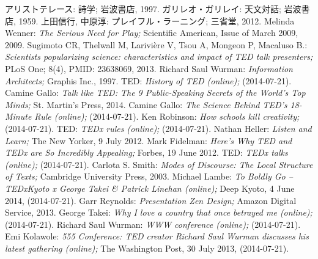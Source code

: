 \documentclass[submit,techreq,jkeyword,noauthor]{ipsj}
\begin{document}
\begin{thebibliography}{10}
 アリストテレース: 詩学; 岩波書店, 1997.
 ガリレオ・ガリレイ: 天文対話; 岩波書店, 1959.
 上田信行, 中原淳: プレイフル・ラーニング; 三省堂, 2012.
 Melinda Wenner: \textsl{The Serious Need for Play;} Scientific American, Issue of March 2009, 2009.
 Sugimoto CR, Thelwall M, Larivière V, Tsou A, Mongeon P, Macaluso B.: \textsl{Scientists popularizing science: characteristics and impact of TED talk presenters;} PLoS One; 8(4), PMID: 23638069, 2013. 
 Richard Saul Wurman: \textsl{Information Architects;} Graphis Inc., 1997.
 TED: \textsl{History of TED (online);}  (2014-07-21).
 Camine Gallo: \textsl{Talk like TED: The 9 Public-Speaking Secrets of the World's Top Minds;} St. Martin's Press, 2014.
 Camine Gallo: \textsl{The Science Behind TED's 18-Minute Rule (online);}  (2014-07-21).
 Ken Robinson: \textsl{How schools kill creativity;}  (2014-07-21).
 TED: \textsl{TEDx rules (online);}  (2014-07-21).
 Nathan Heller: \textsl{Listen and Learn;} The New Yorker, 9 July 2012.
 Mark Fidelman: \textsl{Here's Why TED and TEDx are So Incredibly Appealing;} Forbes, 19 June 2012.
 TED: \textsl{TEDx talks  (online);}  (2014-07-21).
 Carlota S. Smith: \textsl{Modes of Discourse: The Local Structure of Texts;} Cambridge University Press, 2003.
 Michael Lambe: \textsl{To Boldly Go – TEDxKyoto x George Takei \& Patrick Linehan (online);} Deep Kyoto, 4 June 2014,  (2014-07-21).
 Garr Reynolds: \textsl{Presentation Zen Design;} Amazon Digital Service, 2013.
 George Takei: \textsl{Why I love a country that once betrayed me (online);}  (2014-07-21).
 Richard Saul Wurman: \textsl{WWW conference (online);}  (2014-07-21).
 Emi Kolawole: \textsl{555 Conference: TED creator Richard Saul Wurman discusses his latest gathering (online);} The Washington Post, 30 July 2013,  (2014-07-21).
\end{thebibliography}
\end{document}
